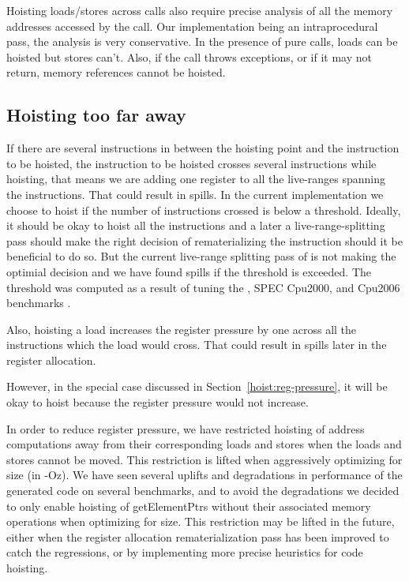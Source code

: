 \documentclass{sig-alternate}
\begin{document}
Hoisting loads/stores across calls also require precise analysis of all the
memory addresses accessed by the call. Our implementation being an
intraprocedural pass, the analysis is very conservative. In the presence of pure
calls, loads can be hoisted but stores can't. Also, if the call throws
exceptions, or if it may not return, memory references cannot be hoisted.

\subsection{Hoisting too far away}
If there are several instructions in between the hoisting point and the
instruction to be hoisted, the instruction to be hoisted crosses several
instructions while hoisting, that means we are adding one register to all the
live-ranges spanning the instructions. That could result in spills. In the
current implementation we choose to hoist if the number of instructions crossed
is below a threshold. Ideally, it should be okay to hoist all the instructions
and a later a live-range-splitting \cite{cooper1998live} pass should make the
right decision of rematerializing the instruction should it be beneficial to do
so. But the current live-range splitting pass of \LLVM{} is not making the
optimial decision and we have found spills if the threshold is exceeded. The
threshold was computed as a result of tuning the \LLVMTestSuite{}, SPEC Cpu2000,
and Cpu2006 benchmarks \cite{Henning2000}.

Also, hoisting a load increases the register pressure by one across all the
instructions which the load would cross. That could result in spills later in
the register allocation.

However, in the special case discussed in Section~\ref{hoist:reg-pressure}, it
will be okay to hoist because the register pressure would not increase.

In order to reduce register pressure, we have restricted hoisting of address
computations away from their corresponding loads and stores when the loads and
stores cannot be moved.  This restriction is lifted when aggressively optimizing
for size (in -Oz).  We have seen several uplifts and degradations in performance
of the generated code on several benchmarks, and to avoid the degradations we
decided to only enable hoisting of getElementPtrs without their associated
memory operations when optimizing for size.  This restriction may be lifted in
the future, either when the register allocation rematerialization pass has been
improved to catch the regressions, or by implementing more precise heuristics
for code hoisting.
\end{document}
